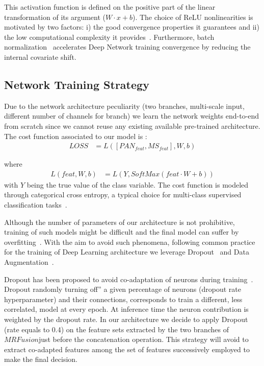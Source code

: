 \documentclass[journal]{IEEEtran}
\newcommand{\method}{$MRFusion$}
\begin{document}
This activation function is defined on the positive part of the linear transformation of its argument ($W \cdot x + b$).  The choice of ReLU nonlinearities is motivated by two factors: i) the good convergence properties it guarantees and ii) the low computational complexity it provides~\cite{NairH10}. Furthermore, batch normalization~\cite{IoffeS15} accelerates Deep Network training convergence by reducing the internal covariate shift.

\subsection{Network Training Strategy }
Due to the network architecture peculiarity (two branches, multi-scale input, different number of channels for branch) we learn the network weights end-to-end from scratch since we cannot reuse any existing available pre-trained architecture.
The cost function associated to our model is :
\begin{align}
LOSS &= L([PAN_{feat}, MS_{feat}], W, b) \label{eqn:cost}
\end{align}

where
\begin{align}
L(feat, W, b) &= L( Y, SoftMax(feat \cdot W + b)) \nonumber
\end{align}
with $Y$ being the true value of the class variable.
The cost function is modeled through categorical cross entropy, a typical choice for multi-class supervised classification tasks~\cite{IencoGDM17}.

Although the number of parameters of our architecture is not prohibitive, training of such models might be difficult and the final model can suffer by overfitting~\cite{DahlSH13}. With the aim to avoid such phenomena, following common practice for the training of Deep Learning architecture we leverage Dropout~\cite{DahlSH13} and Data Augmentation~\cite{abs-1712-04621}.

Dropout has been proposed to avoid co-adaptation of neurons during training~\cite{DahlSH13}. Dropout randomly turning off” a given percentage of neurons (dropout rate hyperparameter) and their connections, corresponds to train a different, less correlated, model at every epoch. At inference time the neuron contribution is weighted by the dropout rate.
In our architecture we decide to apply Dropout (rate equals to 0.4) on the feature sets extracted by the two branches of \method just before the concatenation operation. This strategy will avoid to extract co-adapted features among the set of features successively employed to make the final decision.
\end{document}
